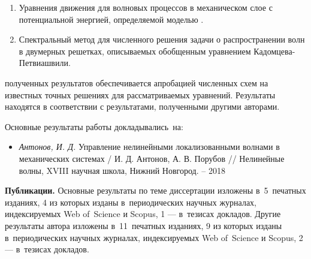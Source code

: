 {}
\begin{enumerate}[beginpenalty=10000] %
  \item {Уравнения движения для волновых процессов в механическом слое с потенциальной энергией, определяемой моделью \cite{bound_porsp17}.}
  \item {Спектральный метод для численного решения задачи о распространении волн в двумерных решетках, описываемых обобщенным уравнением Кадомцева-Петвиашвили.}
\end{enumerate}

{\reliability} полученных результатов обеспечивается апробацией численных схем на известных точных решениях для рассматриваемых уравнений. Результаты находятся в соответствии с результатами, полученными другими авторами.


{\probation}
Основные результаты работы докладывались~на:
\begin{itemize}
\item \textit{Антонов, И. Д.} Управление нелинейными локализованными волнами в
механических системах / И. Д. Антонов, А. В. Порубов // Нелинейные волны, XVIII научная школа, Нижний Новгород. -- 2018
\end{itemize}


\textbf{Публикации.} Основные результаты по теме диссертации изложены в~5~печатных изданиях, 4 из которых изданы в~периодических научных журналах, индексируемых Web of~Science и Scopus, 1 --- в~тезисах докладов. Другие результаты автора изложены в~11~печатных изданиях, 9 из которых изданы в~периодических научных журналах, индексируемых Web of~Science и Scopus, 2 --- в~тезисах докладов.

